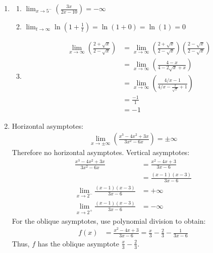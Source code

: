 \begin{enumerate}
    \item \begin{enumerate}\setlength\itemsep{12pt}
    
		\item $\displaystyle{\lim_{x\to 5^-} \left(\frac{3x}{2x-10}\right)} = -\infty$

		\item $\displaystyle{\lim_{t\to \infty}\ln\left(1+\frac{1}{t}\right)}
 = \ln(1 + 0) = \ln(1) = 0 $
 
		\item \begin{align*} 
        	\lim_{x\to \infty} \left(\frac{2+\sqrt{x}}{2-\sqrt{x}}\right) &= 
        	\lim_{x\to \infty} \left(\frac{2+\sqrt{x}}{2-\sqrt{x}}\right)\left(\frac{2-\sqrt{x}}{2-\sqrt{x}}\right) \\ &=
            \lim_{x\to \infty} \left(\frac{4-x}{4-2\sqrt{x}+x}\right)  \\ &= 
            \lim_{x\to \infty} \left(\frac{4/x-1}{4/x-\frac{2}{\sqrt{x}}+1}\right)  \\ &= 
            \frac{-1}{1} \\ &= 
            -1
            \end{align*}

	\end{enumerate}

	\item Horizontal asymptotes: 
    \begin{align*} 
    	\lim_{x\to \pm \infty } \left(\frac{x^3-4x^2+3x}{3x^2-6x}\right) = \pm \infty 
    \end{align*}
    Therefore no horizontal asymptotes. Vertical asymptotes: 
	\begin{align*} 
    	\frac{x^3-4x^2+3x}{3x^2-6x} &= \frac{x^2-4x+3}{3x-6}\\
        &= \frac{(x-1)(x-3)}{3x-6}\\
    	\lim_{x\to 2 ^- } \frac{(x-1)(x-3)}{3x-6} &= +\infty \\
    	\lim_{x\to 2 ^+ } \frac{(x-1)(x-3)}{3x-6} &= -\infty 
    \end{align*}
	For the oblique asymptotes, use polynomial division to obtain:
    \begin{align*} 
    	f(x) &= \frac{x^2-4x+3}{3x-6} = \frac x 3 - \frac 2 3 - \frac{1}{3x - 6}
    \end{align*}
	Thus, $f$ has the oblique asymptote $\frac x 3 - \frac 2 3$.
    

\end{enumerate}
